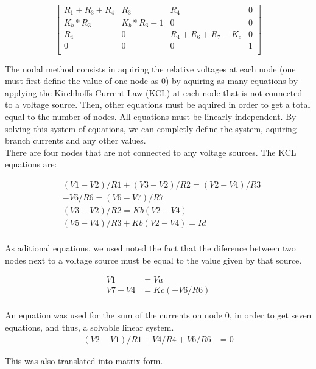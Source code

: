 $$
\begin{bmatrix} 
R_1+R_3+R_4 & R_3       & R_4             & 0 \\       
K_b*R_3     & K_b*R_3-1 & 0               & 0 \\
R_4         &     0     & R_4+R_6+R_7-K_c & 0 \\
0           & 0         & 0               & 1 \\
\end {bmatrix} 
$$
\quad

The nodal method consists in aquiring the relative voltages at each node (one must first define the value of one node as 0) by aquiring as many equations by applying the Kirchhoffs Current Law (KCL) at each node that is not connected to a voltage source. Then, other equations must be aquired in order to get a total equal to the number of nodes. All equations must be linearly independent. By solving this system of equations, we can completly define the system, aquiring branch currents and any other values.\\

There are four nodes that are not connected to any voltage sources. The KCL equations are: 

\begin{align*} 
&(V1-V2)/R1+(V3-V2)/R2 = (V2-V4)/R3 \\ 
&-V6/R6 = (V6-V7)/R7\\
&(V3-V2)/R2 = Kb(V2-V4) \\
&(V5-V4)/R3+Kb(V2-V4) = Id \\
\end{align*}

 
As aditional equations, we used noted the fact that the diference between two nodes next to a voltage source must be equal to the value given by that source. 

\begin{align*} 
V1&=Va \\ V7-V4&=Kc(-V6/R6)\\
\end{align*}

An equation was used for the sum of the currents on node 0, in order to get seven equations, and thus, a solvable linear system.
\begin{align*} 
(V2-V1)/R1+V4/R4+V6/R6&=0
\end{align*}
 
This was also translated into matrix form.

